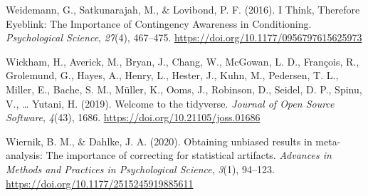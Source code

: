 \documentclass[
  man,
  floatsintext,
  longtable,
  nolmodern,
  notxfonts,
  notimes,
  colorlinks=true,linkcolor=blue,citecolor=blue,urlcolor=blue]{apa7}
\newlength{\cslhangindent}
\newenvironment{CSLReferences}[2] %
 {\begin{list}{}{%
  \setlength{\itemindent}{0pt}
  \setlength{\leftmargin}{0pt}
  \setlength{\parsep}{0pt}
  \ifodd #1
   \setlength{\leftmargin}{\cslhangindent}
   \setlength{\itemindent}{-1\cslhangindent}
  \fi
  \setlength{\itemsep}{#2\baselineskip}}}
 {\end{list}}
\begin{document}
\begin{CSLReferences}{1}{0}
Weidemann, G., Satkunarajah, M., \& Lovibond, P. F. (2016). I Think,
Therefore Eyeblink: The Importance of Contingency Awareness in
Conditioning. \emph{Psychological Science}, \emph{27}(4), 467--475.
\url{https://doi.org/10.1177/0956797615625973}

Wickham, H., Averick, M., Bryan, J., Chang, W., McGowan, L. D.,
François, R., Grolemund, G., Hayes, A., Henry, L., Hester, J., Kuhn, M.,
Pedersen, T. L., Miller, E., Bache, S. M., Müller, K., Ooms, J.,
Robinson, D., Seidel, D. P., Spinu, V., \ldots{} Yutani, H. (2019).
Welcome to the {tidyverse}. \emph{Journal of Open Source Software},
\emph{4}(43), 1686. \url{https://doi.org/10.21105/joss.01686}

Wiernik, B. M., \& Dahlke, J. A. (2020). Obtaining unbiased results in
meta-analysis: The importance of correcting for statistical artifacts.
\emph{Advances in Methods and Practices in Psychological Science},
\emph{3}(1), 94--123. \url{https://doi.org/10.1177/2515245919885611}

\end{CSLReferences}
\end{document}
